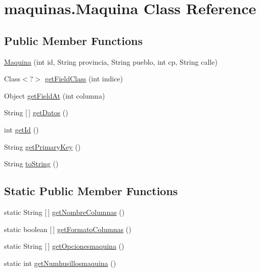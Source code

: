 \hypertarget{classmaquinas_1_1_maquina}{}\section{maquinas.\+Maquina Class Reference}
\label{classmaquinas_1_1_maquina}
\subsection*{Public Member Functions}
\begin{DoxyCompactItemize}
\item 
\mbox{\hyperlink{classmaquinas_1_1_maquina_a2380ac88477dd8ba35c4525c3c059622}{Maquina}} (int id, String provincia, String pueblo, int cp, String calle)
\item 
Class$<$?$>$ \mbox{\hyperlink{classmaquinas_1_1_maquina_ade3b0837e2f5242909de159b98c3f6a1}{get\+Field\+Class}} (int indice)
\item 
Object \mbox{\hyperlink{classmaquinas_1_1_maquina_ab9e0a71d979ac6b404b2b92697d90bed}{get\+Field\+At}} (int columna)
\item 
String \mbox{[}$\,$\mbox{]} \mbox{\hyperlink{classmaquinas_1_1_maquina_acecbf442bf72f0dc926017d80101d8c1}{get\+Datos}} ()
\item 
int \mbox{\hyperlink{classmaquinas_1_1_maquina_abaf73d4cd4f7608d86d303ff20046019}{get\+Id}} ()
\item 
String \mbox{\hyperlink{classmaquinas_1_1_maquina_a96e2d5af0f84acd39c23cc43d513f3ee}{get\+Primary\+Key}} ()
\item 
String \mbox{\hyperlink{classmaquinas_1_1_maquina_ada0867d43ce0cbaf143f33f8104f8e12}{to\+String}} ()
\end{DoxyCompactItemize}
\subsection*{Static Public Member Functions}
\begin{DoxyCompactItemize}
\item 
static String \mbox{[}$\,$\mbox{]} \mbox{\hyperlink{classmaquinas_1_1_maquina_a47e430c44c10450125499adaeb26531c}{get\+Nombre\+Columnas}} ()
\item 
static boolean \mbox{[}$\,$\mbox{]} \mbox{\hyperlink{classmaquinas_1_1_maquina_a8bb7dae09526ff44e0e905be4305382c}{get\+Formato\+Columnas}} ()
\item 
static String \mbox{[}$\,$\mbox{]} \mbox{\hyperlink{classmaquinas_1_1_maquina_af991a3b43334a33919d562d5a76e1d38}{get\+Opcionesmaquina}} ()
\item 
static int \mbox{\hyperlink{classmaquinas_1_1_maquina_a3107d0b82d1a52fce00723abdd6d47b2}{get\+Numhusillosmaquina}} ()
\end{DoxyCompactItemize}


